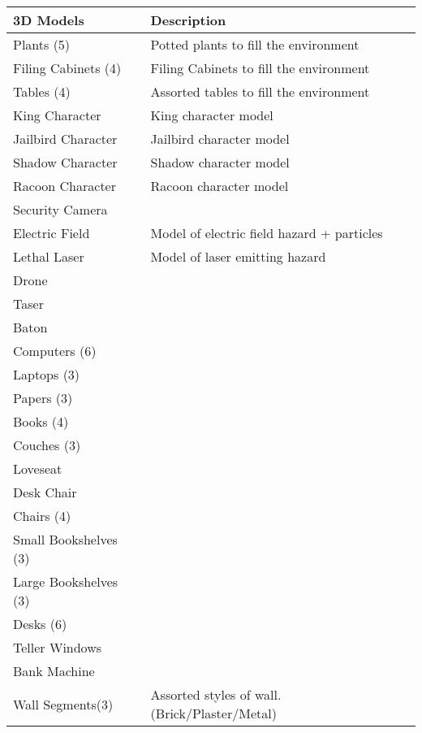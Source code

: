 \documentclass[10pt]{report}
\begin{document}
\begin{center}
    \begin{tabular}{| p{.45\linewidth} | p{.45\linewidth} |}
        \hline    
        3D Models   & Description  \\ \hline
        Plants (5)  &   Potted plants to fill the environment \\ \hline
        Filing Cabinets (4) &  Filing Cabinets to fill the environment \\ \hline
        Tables (4)  &  Assorted tables to fill the environment \\ \hline
        King Character  &  King character model \\ \hline
        Jailbird Character  &  Jailbird character model \\ \hline
        Shadow Character    &  Shadow character model \\ \hline
        Racoon Character    &  Racoon character model \\ \hline
        Security Camera &   \\ \hline
        Electric Field  &  Model of electric field hazard + particles \\ \hline
        Lethal Laser    &  Model of laser emitting hazard \\ \hline
        Drone   &  \\ \hline
        Taser   &  \\ \hline
        Baton   &  \\ \hline
        Computers (6)   &  \\ \hline
        Laptops (3) &  \\ \hline
        Papers (3)  &  \\ \hline
        Books (4)   &  \\ \hline
        Couches (3)  &  \\ \hline
        Loveseat    &  \\ \hline
        Desk Chair  &  \\ \hline
        Chairs (4)  &  \\ \hline
        Small Bookshelves (3)   &  \\ \hline
        Large Bookshelves (3)   &  \\ \hline
        Desks (6)   &  \\ \hline
        Teller Windows  &  \\ \hline
        Bank Machine    &  \\ \hline
        Wall Segments(3)    & Assorted styles of wall. (Brick/Plaster/Metal) \\
        \hline
    \end{tabular}
\end{center}
    
\end{document}
